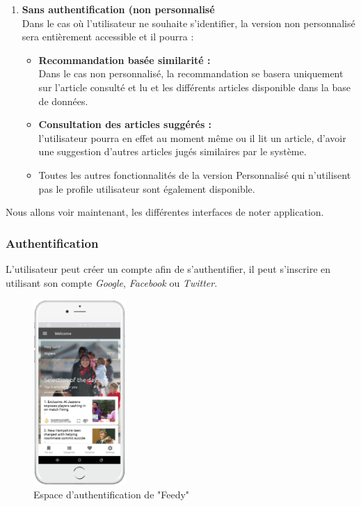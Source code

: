 \begin{enumerate}[leftmargin=*]
        \item\textbf{Sans authentification (non personnalisé}\\
        Dans le cas où l'utilisateur ne souhaite s'identifier, la version non personnalisé sera entièrement accessible et il pourra :
        \begin{itemize}
            \item \textbf{Recommandation basée similarité :}\\
            Dans le cas non personnalisé, la recommandation se basera uniquement sur l'article consulté et lu et les différents articles disponible dans la base de données.    
            \item \textbf{Consultation des articles suggérés :}\\
            l'utilisateur pourra en effet au moment même ou il lit un article, d'avoir une suggestion d'autres articles jugés similaires par le système.
            \item Toutes les autres fonctionnalités de la version Personnalisé qui n'utilisent pas le profile utilisateur sont également disponible.
        \end{itemize}
    \end{enumerate}
    \vspace*{0.7cm}
    Nous allons voir maintenant, les différentes interfaces de noter application.
    \subsubsection{Authentification}
    L'utilisateur peut créer un compte afin de s'authentifier, il peut s'inscrire en utilisant son compte \emph{Google}, \emph{Facebook} ou \emph{Twitter}. 
        \begin{figure}[H]
            \centering
            \includegraphics[height=200pt,width=100pt]{img/chapter4/feedny/feedny.png}
            \caption{Espace d'authentification de "Feedy"}
            \label{}
        \end{figure}

